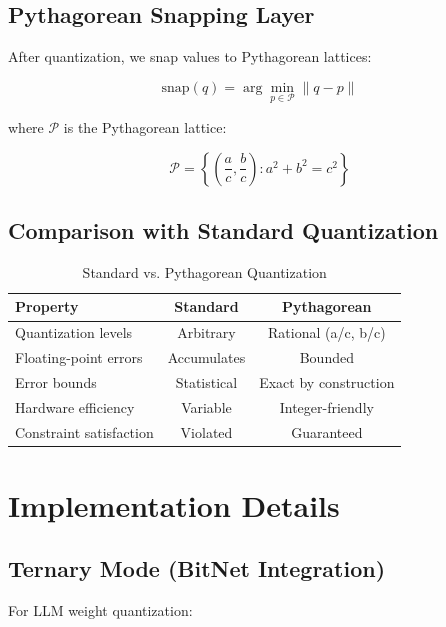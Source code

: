 \documentclass{article}
\begin{document}
\subsection{Pythagorean Snapping Layer}

After quantization, we snap values to Pythagorean lattices:

\begin{equation}
\text{snap}(q) = \arg\min_{p \in \mathcal{P}} \|q - p\|
\end{equation}

where $\mathcal{P}$ is the Pythagorean lattice:

\begin{equation}
\mathcal{P} = \left\{ \left(\frac{a}{c}, \frac{b}{c}\right) : a^2 + b^2 = c^2 \right\}
\end{equation}

\subsection{Comparison with Standard Quantization}

\begin{table}[h]
\centering
\begin{tabular}{lcc}
\toprule
\textbf{Property} & \textbf{Standard} & \textbf{Pythagorean} \\
\midrule
Quantization levels & Arbitrary & Rational (a/c, b/c) \\
Floating-point errors & Accumulates & Bounded \\
Error bounds & Statistical & Exact by construction \\
Hardware efficiency & Variable & Integer-friendly \\
Constraint satisfaction & Violated & Guaranteed \\
\bottomrule
\end{tabular}
\caption{Standard vs. Pythagorean Quantization}
\end{table}

\section{Implementation Details}

\subsection{Ternary Mode (BitNet Integration)}

For LLM weight quantization:
\end{document}
